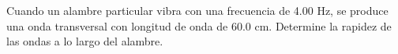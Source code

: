 \item Cuando un alambre particular vibra con una frecuencia de 4.00 Hz, se produce una onda transversal con longitud de onda de 60.0 cm. Determine la rapidez de las ondas a lo largo del alambre.